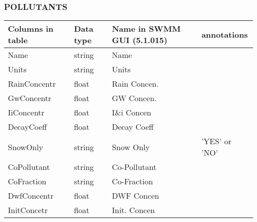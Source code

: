 \documentclass[10pt,a4paper,oneside]{scrbook}
\begin{document}
\subsubsection{POLLUTANTS}
\begin{tabular}{p{2cm}|p{1.3cm}|P{3cm}|P{7.7cm}}
\hline 
\textbf{Columns in table} & \textbf{Data type} & \textbf{Name in SWMM GUI (5.1.015)} & \textbf{annotations}\\ 
\hline 
Name & string & Name & \\
Units & string & Units & \\ 
RainConcentr & float & Rain Concen. & \\ 
GwConcentr & float & GW Concen. & \\ 
IiConcentr & float & I\&i Concen & \\ 
DecayCoeff & float & Decay Coeff & \\ 
SnowOnly & string & Snow Only & 'YES' or 'NO' \\ 
CoPollutant & string & Co-Pollutant & \\
CoFraction & string & Co-Fraction & \\ 
DwfConcentr & float & DWF Concen & \\
InitConcetr & float & Init. Concen & \\ 
\hline
\end{tabular}
\end{document}
